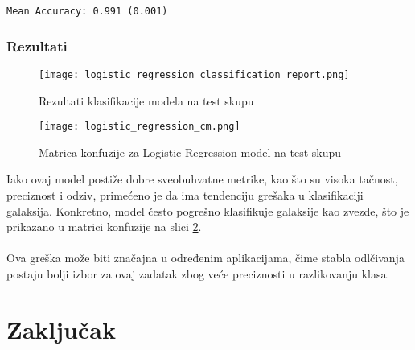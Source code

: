 \documentclass[a4paper,12pt]{article}
\begin{document}
\begin{verbatim}
Mean Accuracy: 0.991 (0.001)
\end{verbatim}

\clearpage

\subsubsection{Rezultati}

\begin{figure}[h!]
\centering
\texttt{[image: logistic\_regression\_classification\_report.png]}
\caption{Rezultati klasifikacije modela na test skupu}
\label{fig:logistic_regression_classification_report}
\end{figure}

\begin{figure}[h!]
\centering
\texttt{[image: logistic\_regression\_cm.png]}
\caption{Matrica konfuzije za Logistic Regression model na test skupu}
\label{fig:logistic_regression_cm}
\end{figure}

Iako ovaj model postiže dobre sveobuhvatne metrike, kao što su visoka tačnost, preciznost i odziv, primećeno je da ima tendenciju grešaka u klasifikaciji galaksija. Konkretno, model često pogrešno klasifikuje galaksije kao zvezde, što je prikazano u matrici konfuzije na slici \ref{fig:logistic_regression_cm}.\\\\
Ova greška može biti značajna u određenim aplikacijama, čime stabla odlčivanja postaju bolji izbor za ovaj zadatak zbog veće preciznosti u razlikovanju klasa.

\section{Zaključak}


\begin{thebibliography}{9}
\end{thebibliography}
\end{document}
